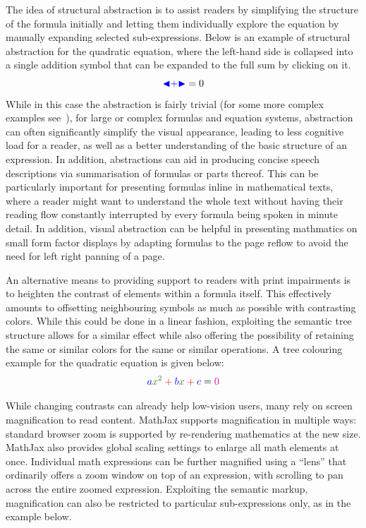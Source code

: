 \documentclass{sig-alternate}
\def\collapse#1{\textcolor{blue}{\ensuremath{\mathord{\blacktriangleleft}
\mathord{#1}
\mathord{\blacktriangleright}}}}
\begin{document}
The idea of structural abstraction is to assist readers by simplifying the
structure of the formula initially and letting them individually explore the
equation by manually expanding selected sub-expressions. Below is an example of
structural abstraction for the quadratic equation, where the left-hand side is
collapsed into a single addition symbol that can be expanded to the full sum by
clicking on it.
\[\collapse{+}=0\]
While in this case the abstraction is fairly trivial (for some more complex
examples see~\cite{cervone2016towards}), for large or complex formulas and
equation systems, abstraction can often significantly simplify the visual
appearance, leading to less cognitive load for a reader, as well as a better
understanding of the basic structure of an expression. In addition, abstractions
can aid in producing concise speech descriptions via summarisation of formulas
or parts thereof. This can be particularly important for presenting formulas
inline in mathematical texts, where a reader might want to understand the whole
text without having their reading flow constantly interrupted by every formula
being spoken in minute detail. In addition, visual abstraction can be helpful in
presenting mathmatics on small form factor displays by adapting formulas to the
page reflow to avoid the need for left right panning of a page.


An alternative means to providing support to readers with print impairments is
to heighten the contrast of elements within a formula itself. This effectively
amounts to offsetting neighbouring symbols as much as possible with contrasting
colors. While this could be done in a linear fashion, exploiting the semantic
tree structure allows for a similar effect while also offering the possibility
of retaining the same or similar colors for the same or similar operations. A
tree colouring example for the quadratic equation is given below:
\[\color{blue}a \color{OliveGreen}x^2 \color{red}+ \color{blue}b
  \color{OliveGreen}x \color{red}+ \color{blue}c \color{black}= \color{magenta}0\]

While changing contrasts can already help low-vision users, many rely on screen
magnification to read content.  MathJax supports magnification in multiple ways:
standard browser zoom is supported by re-rendering mathematics at the new size.
MathJax also provides global scaling settings to enlarge all math elements at
once.  Individual math expressions can be further magnified using a ``lens''
that ordinarily offers a zoom window on top of an expression, with scrolling to
pan across the entire zoomed expression. Exploiting the semantic markup,
magnification can also be restricted to particular sub-expressions only, as in
the example below.
\end{document}
